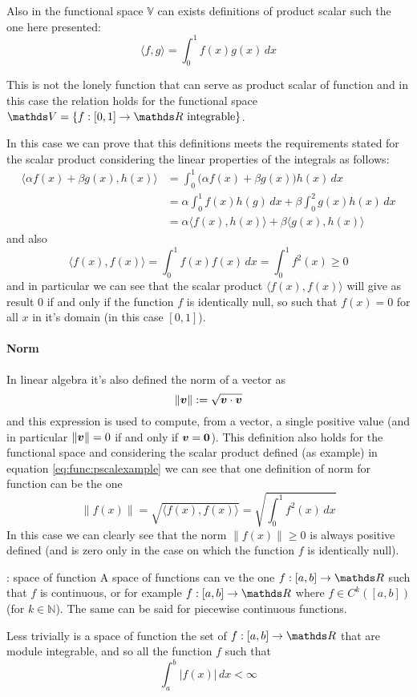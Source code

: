 	Also in the functional space $\mathds V$ can exists definitions of product scalar such the one here presented:
	\begin{equation} \label{eq:func:pscalexample}
		\langle f,g\rangle = \int_0^1 f(x)g(x)\, dx
	\end{equation}
	\begin{note}
		This is not the lonely function that can serve as product scalar of function and in this case the relation holds for the functional space $\mathds V = \{ f:[0,1] \rightarrow \R \textrm{ integrable} \}$.
	\end{note}
	In this case we can prove that this definitions meets the requirements stated for the scalar product considering the linear properties of the integrals as follows:
	\begin{align*}
		\langle \alpha f(x) + \beta g(x),h(x) \rangle & = \int_0^1 \Big(\alpha f(x) + \beta g(x)\Big)h(x) \, dx \\ 
		& = \alpha \int_0^1 f(x)h(g) \, dx + \beta \int_0^2 g(x)h(x) \, dx \\
		& = \alpha \langle f(x),h(x) \rangle + \beta \langle g(x),h(x) \rangle
	\end{align*}
	and also
	\[ \langle f(x),f(x) \rangle = \int_0^1 f(x) f(x) \, dx = \int_0^1 f^2(x)  \geq 0  \]
	and in particular we can see that the scalar product $\langle f(x),f(x)\rangle$ will give as result 0 if and only if the function $f$ is identically null, so such that $f(x) = 0$ for all $x$ in it's domain (in this case $[0,1]$).
	
	\paragraph{Norm} In linear algebra it's also defined the norm of a vector as
	\[ \|\boldsymbol{v}\| := \sqrt{\boldsymbol{v} \cdot \boldsymbol{v}} \]
	and this expression is used to compute, from a vector, a single positive value  (and in particular $\|\boldsymbol{v}\| = 0$ if and only if $\boldsymbol{v} = \boldsymbol{0}$). This definition also holds for the functional space and considering the scalar product defined (as example) in equation \ref{eq:func:pscalexample} we can see that one definition of norm for function can be the one
	\[ \|f(x)\| = \sqrt{\langle f(x),f(x)\rangle} = \sqrt{\int_0^1f^2(x) \, dx} \]
	In this case we can clearly see that the norm $\|f(x)\| \geq 0$ is always positive defined (and is zero only in the case on which the function $f$ is identically null).
	
	
	\begin{example}{: space of function}
		A space of functions can ve the one $f:[a,b]\rightarrow \R$ such that $f$ is continuous, or for example $f:[a,b]\rightarrow \R$ where $f\in C^k([a,b])$ (for $k\in \mathds N$). The same can be said for piecewise continuous functions.
		
		Less trivially is a space of function the set of $f:[a,b]\rightarrow \R$ that are module integrable, and so all the function $f$ such that
		\[\int_a^b |f(x)|\, dx < \infty\]
		
	\end{example}

